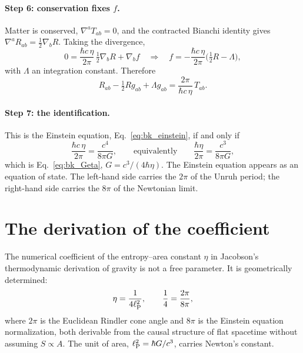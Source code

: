 \paragraph{Step 6: conservation fixes $f$.} Matter is conserved, $\nabla^aT_{ab}=0$, and the contracted Bianchi identity gives $\nabla^aR_{ab}=\tfrac12\nabla_bR$.
Taking the divergence,
\begin{equation}
0=\frac{\hbar c\,\eta}{2\pi}\,\tfrac12\nabla_bR+\nabla_bf\quad\Longrightarrow\quad f=-\frac{\hbar c\,\eta}{2\pi}\Big(\tfrac12R-\Lambda\Big),
\end{equation}
with $\Lambda$ an integration constant. Therefore
\begin{equation}
R_{ab}-\tfrac12Rg_{ab}+\Lambda g_{ab}=\frac{2\pi}{\hbar c\,\eta}\,T_{ab}.
\end{equation} \derived{}

\paragraph{Step 7: the identification.} This is the Einstein equation, Eq.~\eqref{eq:bk_einstein}, if and only if
\begin{equation}
\frac{\hbar c\,\eta}{2\pi}=\frac{c^4}{8\pi G},\qquad\text{equivalently}\qquad\frac{\hbar\eta}{2\pi}=\frac{c^3}{8\pi G},\label{eq:bk_core}
\end{equation}
which is Eq.~\eqref{eq:bk_Geta}, $G=c^3/(4\hbar\eta)$. The Einstein equation appears as an equation of state. The left-hand side carries the $2\pi$ of the Unruh
period; the right-hand side carries the $8\pi$ of the Newtonian limit. \derived

\section{The derivation of the coefficient}\label{sec:bk_derivation}
\begin{keybox}[title={Proposition (geometric determination of the entropy coefficient)}]
The numerical coefficient of the entropy--area constant $\eta$ in Jacobson's thermodynamic derivation of gravity is not a free parameter. It is
geometrically determined:
\begin{equation}
\eta=\frac{1}{4\ell_{\mathrm P}^2},\qquad\frac14=\frac{2\pi}{8\pi},\label{eq:bk_eta}
\end{equation}
where $2\pi$ is the Euclidean Rindler cone angle and $8\pi$ is the Einstein equation normalization, both derivable from the causal structure of flat
spacetime without assuming $S\propto A$. The unit of area, $\ell_{\mathrm P}^2=\hbar G/c^3$, carries Newton's constant. \derived
\end{keybox}

